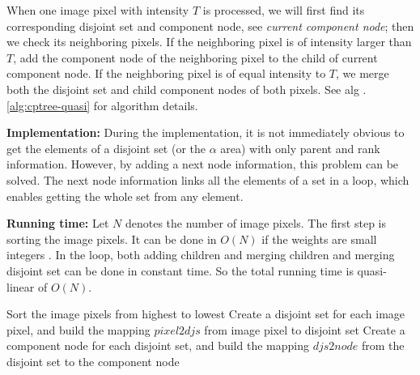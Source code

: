 When one image pixel with intensity $T$ is processed, we will first find its corresponding disjoint set and component node, see \emph{current component node}; then we check its neighboring pixels. If the neighboring pixel is of intensity larger than $T$, add the component node of the neighboring pixel to the child of current component node. If the neighboring pixel is of equal intensity to $T$, we merge both the disjoint set and child component nodes of both pixels. See alg .\ref{alg:cptree-quasi} for algorithm details.

\textbf{Implementation: } During the implementation,  it is not immediately obvious to get the elements of a disjoint set (or the $\alpha$ area) with only parent and rank information. However, by adding a next node information, this problem can be solved. The next node information links all the elements of a set in a loop, which enables getting the whole set from any element.

\textbf{Running time: } Let $N$ denotes the number of image pixels. The first step is sorting the image pixels. It can be done in $O(N)$ if the weights are small integers \cite{cormen2001introduction}. In the loop, both adding children and merging children and merging disjoint set can be done in constant time. So the total running time is quasi-linear of $O(N)$.

\begin{algorithm}[H]
\SetAlgoLined
{}
Sort the image pixels from highest to lowest\;
Create a disjoint set for each image pixel, and build the mapping $pixel2djs$ from image pixel to disjoint set\;
Create a component node for each disjoint set, and build the mapping $djs2node$ from the disjoint set to the component node\;

\end{algorithm}

